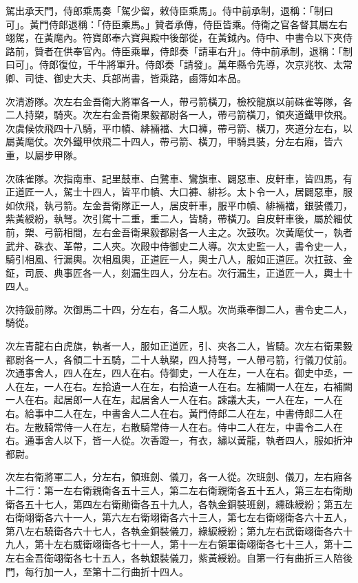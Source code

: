 \begin{pinyinscope}
 駕出承天門，侍郎乘馬奏「駕少留，敕侍臣乘馬」。侍中前承制，退稱：「制曰可」。黃門侍郎退稱：「侍臣乘馬。」贊者承傳，侍臣皆乘。侍衛之官各督其屬左右翊駕，在黃麾內。符寶郎奉六寶與殿中後部從，在黃鉞內。侍中、中書令以下夾侍路前，贊者在供奉官內。侍臣乘畢，侍郎奏「請車右升」。侍中前承制，退稱：「制曰可」。侍郎復位，千牛將軍升。侍郎奏「請發」。萬年縣令先導，次京兆牧、太常卿、司徒、御史大夫、兵部尚書，皆乘路，鹵簿如本品。



 次清游隊。次左右金吾衛大將軍各一人，帶弓箭橫刀，檢校龍旗以前硃雀等隊，各二人持槊，騎夾。次左右金吾衛果毅都尉各一人，帶弓箭橫刀，領夾道鐵甲佽飛。次虞候佽飛四十八騎，平巾幘、緋裲襠、大口褲，帶弓箭、橫刀，夾道分左右，以屬黃麾仗。次外鐵甲佽飛二十四人，帶弓箭、橫刀，甲騎具裝，分左右廂，皆六重，以屬步甲隊。



 次硃雀隊。次指南車、記里鼓車、白鷺車、鸞旗車、闢惡車、皮軒車，皆四馬，有正道匠一人，駕士十四人，皆平巾幘、大口褲、緋衫。太卜令一人，居闢惡車，服如佽飛，執弓箭。左金吾衛隊正一人，居皮軒車，服平巾幘、緋裲襠，銀裝儀刀，紫黃綬紛，執弩。次引駕十二重，重二人，皆騎，帶橫刀。自皮軒車後，屬於細仗前，槊、弓箭相間，左右金吾衛果毅都尉各一人主之。次鼓吹。次黃麾仗一，執者武弁、硃衣、革帶，二人夾。次殿中侍御史二人導。次太史監一人，書令史一人，騎引相風、行漏輿。次相風輿，正道匠一人，輿士八人，服如正道匠。次扛鼓、金鉦，司辰、典事匠各一人，刻漏生四人，分左右。次行漏生，正道匠一人，輿士十四人。



 次持鈒前隊。次御馬二十四，分左右，各二人馭。次尚乘奉御二人，書令史二人，騎從。



 次左青龍右白虎旗，執者一人，服如正道匠，引、夾各二人，皆騎。次左右衛果毅都尉各一人，各領二十五騎，二十人執槊，四人持弩，一人帶弓箭，行儀刀仗前。次通事舍人，四人在左，四人在右。侍御史，一人在左，一人在右。御史中丞，一人在左，一人在右。左拾遺一人在左，右拾遺一人在右。左補闕一人在左，右補闕一人在右。起居郎一人在左，起居舍人一人在右。諫議大夫，一人在左，一人在右。給事中二人在左，中書舍人二人在右。黃門侍郎二人在左，中書侍郎二人在右。左散騎常侍一人在左，右散騎常侍一人在右。侍中二人在左，中書令二人在右。通事舍人以下，皆一人從。次香蹬一，有衣，繡以黃龍，執者四人，服如折沖都尉。



 次左右衛將軍二人，分左右，領班劍、儀刀，各一人從。次班劍、儀刀，左右廂各十二行：第一左右衛親衛各五十三人，第二左右衛親衛各五十五人，第三左右衛勛衛各五十七人，第四左右衛勛衛各五十九人，各執金銅裝班劍，纁硃綬紛；第五左右衛翊衛各六十一人，第六左右衛翊衛各六十三人，第七左右衛翊衛各六十五人，第八左右驍衛各六十七人，各執金銅裝儀刀，綠綟綬紛；第九左右武衛翊衛各六十九人，第十左右威衛翊衛各七十一人，第十一左右領軍衛翊衛各七十三人，第十二左右金吾衛翊衛各七十五人，各執銀裝儀刀，紫黃綬紛。自第一行有曲折三人陪後門，每行加一人，至第十二行曲折十四人。




\end{pinyinscope}
